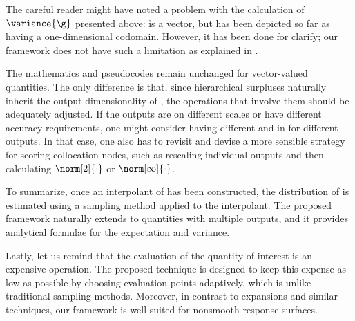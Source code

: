 The careful reader might have noted a problem with the calculation of
$\variance{\g}$ presented above: \h is a vector, but \g has been depicted so far
as having a one-dimensional codomain. However, it has been done for clarify; our
framework does not have such a limitation as explained in
.

\begin{remark} 
The mathematics and pseudocodes remain unchanged for vector-valued quantities.
The only difference is that, since hierarchical surpluses naturally inherit the
output dimensionality of \g, the operations that involve them should be
adequately adjusted. If the outputs are on different scales or have different
accuracy requirements, one might consider having different  and
 in  for different outputs. In that case, one also has
to revisit  and devise a more sensible strategy for scoring
collocation nodes, such as rescaling individual outputs and then calculating
$\norm[2]{\cdot}$ or $\norm[\infty]{\cdot}$.
\end{remark}

To summarize, once an interpolant of \g has been constructed, the distribution
of \g is estimated using a sampling method applied to the interpolant. The
proposed framework naturally extends to quantities with multiple outputs, and it
provides analytical formulae for the expectation and variance.

Lastly, let us remind that the evaluation of the quantity of interest is an
expensive operation. The proposed technique is designed to keep this expense as
low as possible by choosing evaluation points adaptively, which is unlike
traditional sampling methods. Moreover, in contrast to  expansions and
similar techniques, our framework is well suited for nonsmooth response
surfaces.
